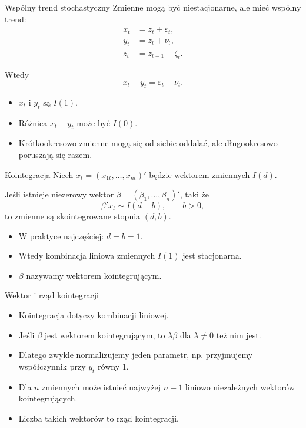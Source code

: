\documentclass[11pt,aspectratio=169,xcolor=dvipsnames]{beamer}
\begin{document}
\begin{frame}{Wspólny trend stochastyczny}
  Zmienne mogą być niestacjonarne, ale mieć wspólny trend:
  \begin{align*}
    x_t &= z_t + \varepsilon_t,\\
    y_t &= z_t + \nu_t,\\
    z_t &= z_{t-1} + \zeta_t.
  \end{align*}

  Wtedy
  \[
    x_t - y_t = \varepsilon_t - \nu_t.
  \]

  \begin{itemize}
    \item $x_t$ i $y_t$ są $I(1)$.
    \item Różnica $x_t-y_t$ może być $I(0)$.
    \item Krótkookresowo zmienne mogą się od siebie oddalać, ale długookresowo poruszają się razem.
  \end{itemize}
\end{frame}

\begin{frame}{Kointegracja}
  Niech $x_t=(x_{1t},\ldots,x_{nt})'$ będzie wektorem zmiennych $I(d)$.

  Jeśli istnieje niezerowy wektor $\beta=(\beta_1,\ldots,\beta_n)'$, taki że
  \[
    \beta'x_t \sim I(d-b), \qquad b>0,
  \]
  to zmienne są skointegrowane stopnia $(d,b)$.

  \begin{itemize}
    \item W praktyce najczęściej: $d=b=1$.
    \item Wtedy kombinacja liniowa zmiennych $I(1)$ jest stacjonarna.
    \item $\beta$ nazywamy wektorem kointegrującym.
  \end{itemize}
\end{frame}

\begin{frame}{Wektor i rząd kointegracji}
  \begin{itemize}
    \item Kointegracja dotyczy kombinacji liniowej.
    \item Jeśli $\beta$ jest wektorem kointegrującym, to $\lambda\beta$ dla $\lambda\neq 0$ też nim jest.
    \item Dlatego zwykle normalizujemy jeden parametr, np. przyjmujemy współczynnik przy $y_t$ równy 1.
    \item Dla $n$ zmiennych może istnieć najwyżej $n-1$ liniowo niezależnych wektorów kointegrujących.
    \item Liczba takich wektorów to rząd kointegracji.
  \end{itemize}
\end{frame}
\end{document}
